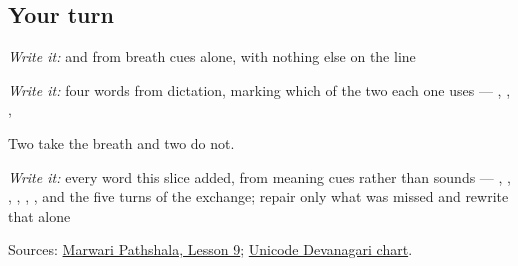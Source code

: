 \subsection*{Your turn}
\emph{Write it:} \textbf{} and \textbf{} from breath cues alone, with nothing else on the line

\emph{Write it:} four words from dictation, marking which of the two each one uses — \textbf{}, \textbf{}, \textbf{}, \textbf{}

Two take the breath and two do not.

\emph{Write it:} every word this slice added, from meaning cues rather than sounds — \textbf{}, \textbf{}, \textbf{}, \textbf{}, \textbf{}, \textbf{}, and the five turns of the exchange; repair only what was missed and rewrite that alone

\begin{tcolorbox}[breakable,colback=teal!4,colframe=teal!35!black,title={Before you move on}]
Sources: \href{https://www.marwaripathshala.com/marwari-lesson-9-english}{Marwari Pathshala, Lesson 9}; \href{https://www.unicode.org/charts/PDF/U0900.pdf}{Unicode Devanagari chart}.
\end{tcolorbox}
